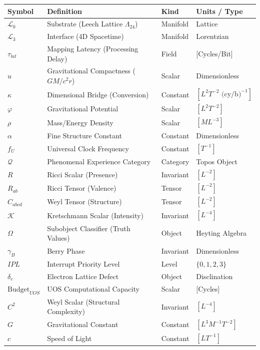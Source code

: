 \documentclass[11pt,titlepage]{article}
\newcommand{\substrate}{\mathcal{L}_0}
\newcommand{\interface}{\mathcal{L}_3}
\newcommand{\leech}{\Lambda_{24}}
\newcommand{\classifier}{\Omega}
\begin{document}
\begin{table}[h!]
\centering
\begin{tabular}{@{}llll@{}}
\toprule
\textbf{Symbol} & \textbf{Definition} & \textbf{Kind} & \textbf{Units / Type} \\ \midrule
$\substrate$ & Substrate (Leech Lattice $\leech$) & Manifold & Lattice \\
$\interface$ & Interface (4D Spacetime) & Manifold & Lorentzian \\
$\tau_{lat}$ & Mapping Latency (Processing Delay) & Field & [Cycles/Bit] \\
$u$ & Gravitational Compactness ($GM/c^2r$) & Scalar & Dimensionless \\
$\kappa$ & Dimensional Bridge (Conversion) & Constant & $[L^2 T^{-2} \text{ (cy/b)}^{-1}]$ \\
$\varphi$ & Gravitational Potential & Scalar & $[L^2 T^{-2}]$ \\
$\rho$ & Mass/Energy Density & Scalar & $[M L^{-3}]$ \\
$\alpha$ & Fine Structure Constant & Constant & Dimensionless \\
$f_U$ & Universal Clock Frequency & Constant & $[T^{-1}]$ \\
$\mathcal{Q}$ & Phenomenal Experience Category & Category & Topos Object \\
$R$ & Ricci Scalar (Presence) & Invariant & $[L^{-2}]$ \\
$R_{ab}$ & Ricci Tensor (Valence) & Tensor & $[L^{-2}]$ \\
$C_{abcd}$ & Weyl Tensor (Structure) & Tensor & $[L^{-2}]$ \\
$\mathcal{K}$ & Kretschmann Scalar (Intensity) & Invariant & $[L^{-4}]$ \\
$\classifier$ & Subobject Classifier (Truth Values) & Object & Heyting Algebra \\
$\gamma_B$ & Berry Phase & Invariant & Dimensionless \\
$IPL$ & Interrupt Priority Level & Level & $\{0, 1, 2, 3\}$ \\
$\delta_e$ & Electron Lattice Defect & Object & Disclination \\
$\text{Budget}_{UOS}$ & UOS Computational Capacity & Scalar & [Cycles] \\
$C^2$ & Weyl Scalar (Structural Complexity) & Invariant & $[L^{-4}]$ \\
$G$ & Gravitational Constant & Constant & $[L^3 M^{-1} T^{-2}]$ \\
$c$ & Speed of Light & Constant & $[L T^{-1}]$ \\

\end{tabular}
\end{table}
\end{document}
